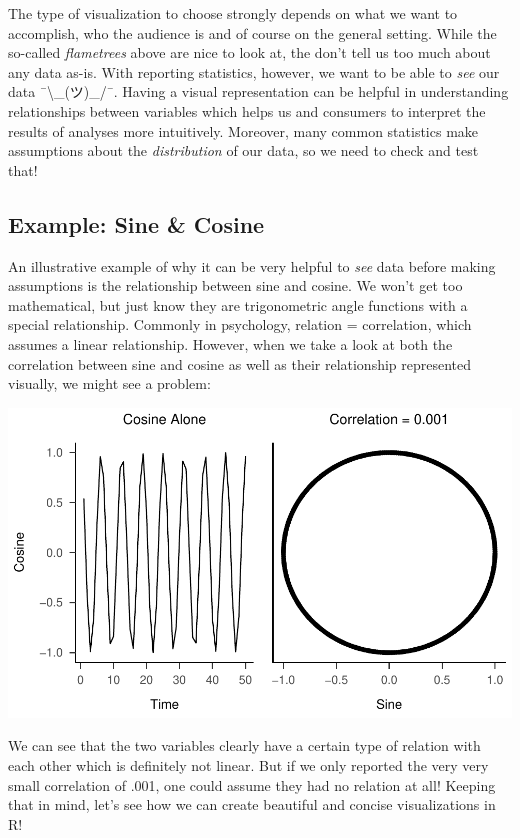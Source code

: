 \documentclass[
]{book}
\begin{document}
The type of visualization to choose strongly depends on what we want to accomplish, who the audience is and of course on the general setting.
While the so-called \emph{flametrees} above are nice to look at, the don't tell us too much about any data as-is.
With reporting statistics, however, we want to be able to \emph{see} our data ¯\textbackslash\_(ツ)\_/¯.
Having a visual representation can be helpful in understanding relationships between variables which helps us and consumers to interpret the results of analyses more intuitively.
Moreover, many common statistics make assumptions about the \emph{distribution} of our data, so we need to check and test that!

\subsection{Example: Sine \& Cosine}\label{example-sine-cosine}

An illustrative example of why it can be very helpful to \emph{see} data before making assumptions is the relationship between sine and cosine.
We won't get too mathematical, but just know they are trigonometric angle functions with a special relationship.
Commonly in psychology, relation = correlation, which assumes a linear relationship.
However, when we take a look at both the correlation between sine and cosine as well as their relationship represented visually, we might see a problem:

\includegraphics{_main_files/figure-html/exsincos-1.pdf}

We can see that the two variables clearly have a certain type of relation with each other which is definitely not linear.
But if we only reported the very very small correlation of .001, one could assume they had no relation at all!
Keeping that in mind, let's see how we can create beautiful and concise visualizations in R!
\end{document}
